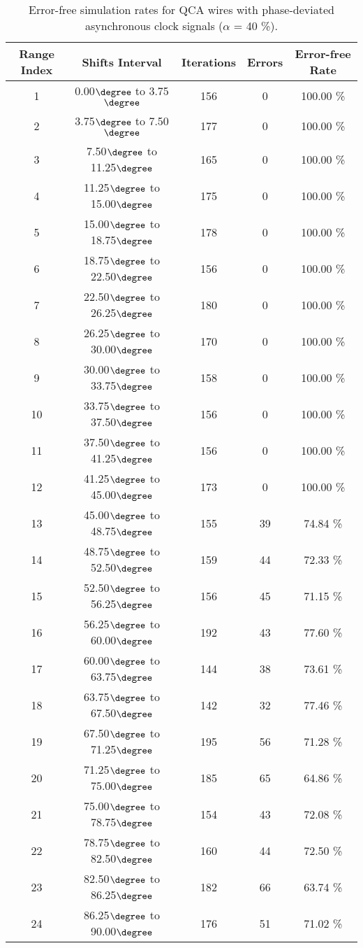 \flushleft
\begin{table}[h]
\begin{center}
\caption{Error-free simulation rates for QCA wires with phase-deviated asynchronous clock signals ($\alpha$ = 40 \%).}
\begin{tabular}{|c|c|c|c|c|}
\hline
\textbf{Range Index} & \textbf{Shifts Interval} & \textbf{Iterations} & \textbf{Errors} & \textbf{Error-free Rate} \\
\hline
1  &  0.00$\degree$ to  3.75$\degree$ & 156 &  0 & 100.00 \% \\
\hline
2  &  3.75$\degree$ to  7.50$\degree$ & 177 &  0 & 100.00 \% \\
\hline
3  &  7.50$\degree$ to 11.25$\degree$ & 165 &  0 & 100.00 \% \\
\hline
4  & 11.25$\degree$ to 15.00$\degree$ & 175 &  0 & 100.00 \% \\
\hline
5  & 15.00$\degree$ to 18.75$\degree$ & 178 &  0 & 100.00 \% \\
\hline
6  & 18.75$\degree$ to 22.50$\degree$ & 156 &  0 & 100.00 \% \\
\hline
7  & 22.50$\degree$ to 26.25$\degree$ & 180 &  0 & 100.00 \% \\
\hline
8  & 26.25$\degree$ to 30.00$\degree$ & 170 &  0 & 100.00 \% \\
\hline
9  & 30.00$\degree$ to 33.75$\degree$ & 158 &  0 & 100.00 \% \\
\hline
10 & 33.75$\degree$ to 37.50$\degree$ & 156 &  0 & 100.00 \% \\
\hline
11 & 37.50$\degree$ to 41.25$\degree$ & 156 &  0 & 100.00 \% \\
\hline
12 & 41.25$\degree$ to 45.00$\degree$ & 173 &  0 & 100.00 \% \\
\hline
13 & 45.00$\degree$ to 48.75$\degree$ & 155 & 39 &  74.84 \% \\
\hline
14 & 48.75$\degree$ to 52.50$\degree$ & 159 & 44 &  72.33 \% \\
\hline
15 & 52.50$\degree$ to 56.25$\degree$ & 156 & 45 &  71.15 \% \\
\hline
16 & 56.25$\degree$ to 60.00$\degree$ & 192 & 43 &  77.60 \% \\
\hline
17 & 60.00$\degree$ to 63.75$\degree$ & 144 & 38 &  73.61 \% \\
\hline
18 & 63.75$\degree$ to 67.50$\degree$ & 142 & 32 &  77.46 \% \\
\hline
19 & 67.50$\degree$ to 71.25$\degree$ & 195 & 56 &  71.28 \% \\
\hline
20 & 71.25$\degree$ to 75.00$\degree$ & 185 & 65 &  64.86 \% \\
\hline
21 & 75.00$\degree$ to 78.75$\degree$ & 154 & 43 &  72.08 \% \\
\hline
22 & 78.75$\degree$ to 82.50$\degree$ & 160 & 44 &  72.50 \% \\
\hline
23 & 82.50$\degree$ to 86.25$\degree$ & 182 & 66 &  63.74 \% \\
\hline
24 & 86.25$\degree$ to 90.00$\degree$ & 176 & 51 &  71.02 \% \\
\hline


\end{tabular}
\end{center}
\end{table}
